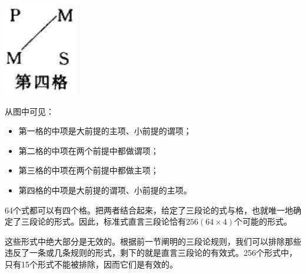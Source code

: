 \begin{center}
\includegraphics[width=\textwidth]{images/2025_05_15_6a28331d5e7c993ad07ag-288(1).jpg}
\end{center}

从图中可见：

\begin{itemize}
  \item 第一格的中项是大前提的主项、小前提的谓项；
  \item 第二格的中项在两个前提中都做谓项；
  \item 第三格的中项在两个前提中都做主项；
  \item 第四格的中项是大前提的谓项、小前提的主项。
\end{itemize}

64个式都可以有四个格。把两者结合起来，给定了三段论的式与格，也就唯一地确定了三段论的形式。因此，标准式直言三段论恰有$256(64 \times 4)$个可能的形式。

这些形式中绝大部分是无效的。根据前一节阐明的三段论规则，我们可以排除那些违反了一条或几条规则的形式，剩下的就是直言三段论的有效式。256个形式中，只有15个形式不能被排除，因而它们是有效的。\cite{patzig1968}

